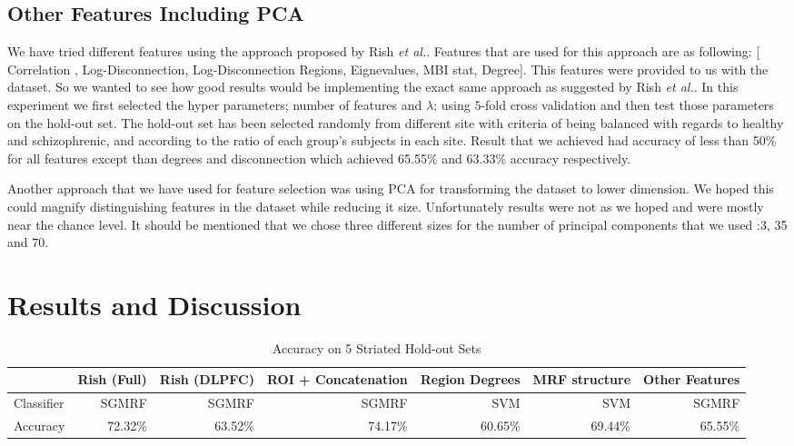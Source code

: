 \documentclass{article} %
\begin{document}
\subsection{Other Features Including PCA}
We have tried different features using the approach proposed by Rish \emph{et al.}. Features that are used for this approach are as following: [ Correlation , Log-Disconnection, Log-Disconnection Regions, Eignevalues, MBI stat, Degree].
This features were provided to us with the dataset. So we wanted to see how good results would be implementing the exact same approach as suggested by Rish \emph{et al.}. In this experiment we first selected the hyper parameters; number of features and $\lambda$; using $5$-fold cross validation and then test those parameters on the hold-out set. The hold-out set has been selected randomly from different site with criteria of being balanced with regards to healthy and schizophrenic, and according to the ratio of each group's subjects in each site. Result that we achieved had accuracy of less than 50\% for all features except than degrees and disconnection which achieved 65.55\% and 63.33\% accuracy respectively. 

Another approach that we have used for feature selection was using PCA for transforming the dataset to lower dimension. We hoped this could magnify distinguishing features in the dataset while reducing it size. Unfortunately results were not as we hoped and were mostly near the chance level. It should be mentioned that we chose three different sizes for the number of principal components that we used :3, 35 and 70.   


\section{Results and Discussion}

\begin{table}[hpt]\footnotesize
\begin{center}
    \begin{tabular}{| l | r | r | r | r | r | r |}
    \hline
                & Rish (Full) & Rish (DLPFC) & ROI + Concatenation & Region Degrees & MRF structure & Other Features \\ \hline
    Classifier  & SGMRF       & SGMRF        & SGMRF               & SVM            & SVM           & SGMRF          \\ \hline
    Accuracy    & 72.32\%     & 63.52\%      & 74.17\%             & 60.65\%        & 69.44\%       & 65.55\%        \\ \hline
    \end{tabular}
    \caption{Accuracy on 5 Striated Hold-out Sets}
     \label{fig:holdout_table}
\end{center}
\end{table}
\end{document}
